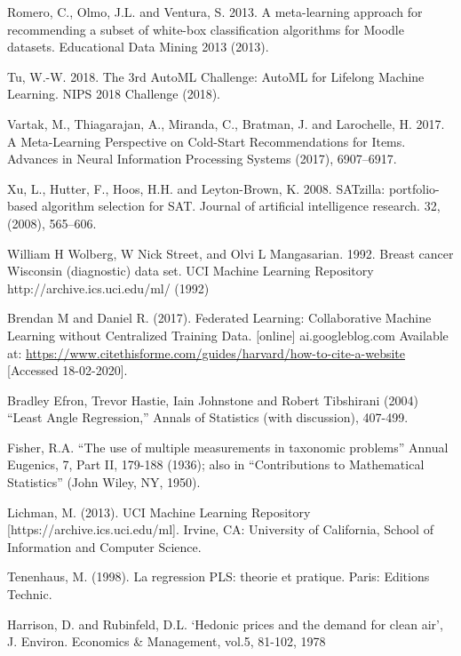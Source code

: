 \documentclass{article}
\begin{document}
\begin{thebibliography}{9}
Romero, C., Olmo, J.L. and Ventura, S. 2013. A meta-learning approach for recommending a subset of white-box classification algorithms for Moodle datasets. Educational Data Mining 2013 (2013).

Tu, W.-W. 2018. The 3rd AutoML Challenge: AutoML for Lifelong Machine Learning. NIPS 2018 Challenge (2018).

Vartak, M., Thiagarajan, A., Miranda, C., Bratman, J. and Larochelle, H. 2017. A Meta-Learning Perspective on Cold-Start Recommendations for Items. Advances in Neural Information Processing Systems (2017), 6907–6917.

Xu, L., Hutter, F., Hoos, H.H. and Leyton-Brown, K. 2008. SATzilla: portfolio-based algorithm selection for SAT. Journal of artificial intelligence research. 32, (2008), 565–606.

William H Wolberg, W Nick Street, and Olvi L Mangasarian. 1992. Breast cancer Wisconsin (diagnostic) data set. UCI Machine Learning Repository {http://archive.ics.uci.edu/ml/} (1992)

Brendan M and Daniel R. (2017). Federated Learning: Collaborative Machine Learning without Centralized Training Data. [online] ai.googleblog.com Available at: \url{https://www.citethisforme.com/guides/harvard/how-to-cite-a-website} [Accessed 18-02-2020].

Bradley Efron, Trevor Hastie, Iain Johnstone and Robert Tibshirani (2004) “Least Angle Regression,” Annals of Statistics (with discussion), 407-499. 

Fisher, R.A. “The use of multiple measurements in taxonomic problems” Annual Eugenics, 7, Part II, 179-188 (1936); also in “Contributions to Mathematical Statistics” (John Wiley, NY, 1950).

Lichman, M. (2013). UCI Machine Learning Repository [https://archive.ics.uci.edu/ml]. Irvine, CA: University of California, School of Information and Computer Science.

Tenenhaus, M. (1998). La regression PLS: theorie et pratique. Paris: Editions Technic.

Harrison, D. and Rubinfeld, D.L. ‘Hedonic prices and the demand for clean air’, J. Environ. Economics \& Management, vol.5, 81-102, 1978

\end{thebibliography}



\end{document}

